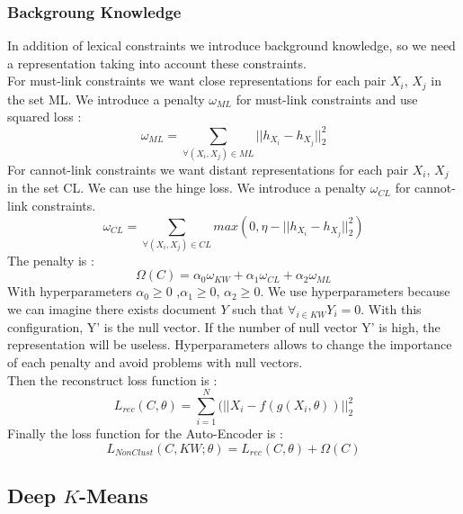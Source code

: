 \subsubsection{Backgroung Knowledge}
In addition of lexical constraints we introduce background knowledge, so we need
a representation taking into account these constraints.\\
For must-link constraints we want close representations for each pair $X_i$, $X_j$
in the set ML. We introduce a penalty $\omega_{ML}$ for must-link
constraints and use squared loss :
\begin{equation}\label{eq:omegaML}
  \omega_{ML} = \sum_{\forall{(X_i,X_j)\in ML}} || h_{X_i} - h_{X_j} ||_2^2
\end{equation}
For cannot-link constraints we want distant representations for each pair $X_i$,
$X_j$ in the set CL.
We can use the hinge loss.
We introduce a penalty $\omega_{CL}$ for cannot-link constraints.
\begin{equation}\label{eq:omegaCL}
  \omega_{CL} = \sum_{\forall{(X_i,X_j)\in CL}} max(0,
  \eta - || h_{X_i} - h_{X_j} ||_2^2)
\end{equation}
The penalty is :
\begin{equation}\label{eq:Sparse}
  \Omega(C) = \alpha_0\omega_{KW} + \alpha_1\omega_{CL} + \alpha_2\omega_{ML}  
\end{equation}
With hyperparameters $\alpha_0\geq 0$ ,$\alpha_1\geq 0$, $\alpha_2\geq 0$. We use
hyperparameters because we can imagine there exists document $Y$ such that
$\forall_{i \in KW} Y_i = 0$. With this configuration, Y' is the null vector. If the
number of null vector Y' is high, the representation will be useless.
Hyperparameters allows to change the importance of each penalty
and avoid problems with null vectors.\\
Then the reconstruct loss function is :
\begin{equation}\label{eq:AEDK}
  L_{rec}(C, \theta) = \sum_{i=1}^N(||X_i - f(g(X_i, \theta))||_2^2
\end{equation}
Finally the loss function for the Auto-Encoder is :
\begin{equation}\label{eq:AE}
  L_{NonClust}(C,KW; \theta) = L_{rec}(C, \theta) + \Omega(C)  
\end{equation}

\subsection{Deep $K$-Means}

